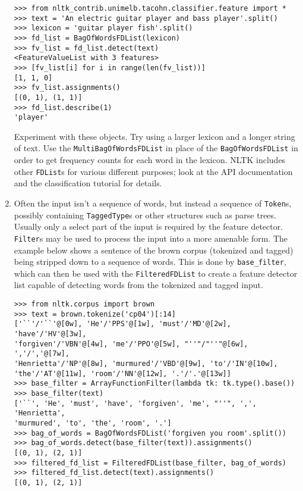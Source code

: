 \documentclass{worksheet}
\begin{document}
\begin{enumerate}
\begin{verbatim}
>>> from nltk_contrib.unimelb.tacohn.classifier.feature import *
>>> text = 'An electric guitar player and bass player'.split()
>>> lexicon = 'guitar player fish'.split()
>>> fd_list = BagOfWordsFDList(lexicon)
>>> fv_list = fd_list.detect(text)
<FeatureValueList with 3 features>
>>> [fv_list[i] for i in range(len(fv_list))]
[1, 1, 0]
>>> fv_list.assignments()
[(0, 1), (1, 1)]
>>> fd_list.describe(1)
'player'
\end{verbatim}

Experiment with these objects. Try using a larger lexicon and a longer string
of text. Use the \texttt{MultiBagOfWordsFDList} in place of the
\texttt{BagOfWordsFDList} in order to get frequency counts for each word in
the lexicon. NLTK includes other \texttt{FDList}s for various different
purposes; look at the API documentation and the classification tutorial for
details.

\item Often the input isn't a sequence of words, but instead a sequence of
\texttt{Token}s, possibly containing \texttt{TaggedType}s or other structures
such as parse trees. Usually only a select part of the input is required by
the feature detector. \texttt{Filter}s may be used to process the input into
a more amenable form. The example below shows a sentence of the brown corpus
(tokenized and tagged) being stripped down to a sequence of words. This is
done by \texttt{base\_filter}, which can then be used with the
\texttt{FilteredFDList} to create a feature detector list capable of
detecting words from the tokenized and tagged input.

\begin{verbatim}
>>> from nltk.corpus import brown
>>> text = brown.tokenize('cp04')[:14]
['``'/'``'@[0w], 'He'/'PPS'@[1w], 'must'/'MD'@[2w], 'have'/'HV'@[3w],
'forgiven'/'VBN'@[4w], 'me'/'PPO'@[5w], "''"/"''"@[6w], ','/','@[7w],
'Henrietta'/'NP'@[8w], 'murmured'/'VBD'@[9w], 'to'/'IN'@[10w],
'the'/'AT'@[11w], 'room'/'NN'@[12w], '.'/'.'@[13w]]
>>> base_filter = ArrayFunctionFilter(lambda tk: tk.type().base())
>>> base_filter(text)
['``', 'He', 'must', 'have', 'forgiven', 'me', "''", ',', 'Henrietta',
'murmured', 'to', 'the', 'room', '.']
>>> bag_of_words = BagOfWordsFDList('forgiven you room'.split())
>>> bag_of_words.detect(base_filter(text)).assignments()
[(0, 1), (2, 1)]
>>> filtered_fd_list = FilteredFDList(base_filter, bag_of_words)
>>> filtered_fd_list.detect(text).assignments()
[(0, 1), (2, 1)]
\end{verbatim}


\end{enumerate}
\end{document}
